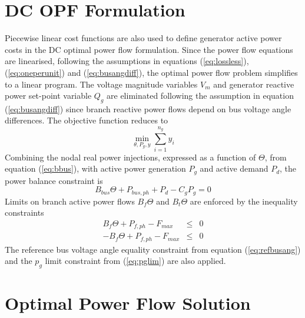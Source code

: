 \section{DC OPF Formulation}
Piecewise linear cost functions are also used to define generator active power
costs in the DC optimal power flow formulation.  Since the power flow equations
are linearised, following the assumptions in equations (\ref{eq:lossless}),
(\ref{eq:oneperunit}) and (\ref{eq:busangdiff}), the optimal power flow
problem simplifies to a linear program.  The voltage magnitude variables $V_m$
and generator reactive power set-point variable $Q_g$ are eliminated following
the assumption in equation (\ref{eq:busangdiff}) since branch reactive power
flows depend on bus voltage angle differences.  The objective function reduces to
\begin{equation}
\min_{\theta, P_g, y} \sum_{i=1}^{n_g}y_i
\end{equation}
Combining the nodal real power injections, expressed as a function of $\Theta$,
from equation (\ref{eq:bbus}), with active power generation $P_g$ and active
demand $P_d$, the power balance constraint is
\begin{equation}
B_{bus}\Theta + P_{bus,ph} + P_d - C_gP_g = 0
\end{equation}
Limits on branch active power flows $B_f\Theta$ and $B_t\Theta$ are enforced by
the inequality constraints
\begin{eqnarray}
B_f\Theta + P_{f,ph} - F_{max}& \leq& 0\\
-B_f\Theta + P_{f,ph} - F_{max}& \leq& 0
\end{eqnarray}
The reference bus voltage angle equality constraint from
equation (\ref{eq:refbusang}) and the $p_g$ limit constraint from
(\ref{eq:pglim}) are also applied.

\section{Optimal Power Flow Solution}
\label{sec:opfsol}

